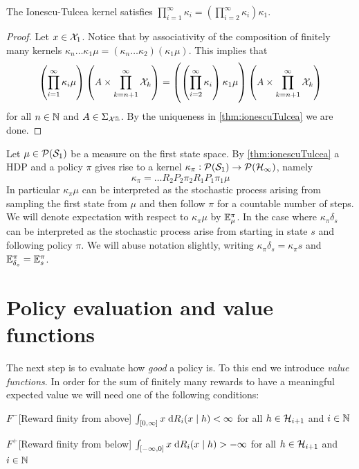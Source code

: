 \begin{lem}
  The Ionescu-Tulcea kernel satisfies
  $\prod_{i=1}^\infty \kappa_i = (\prod_{i=2}^\infty \kappa_i) \kappa_1 $.
  \label{lem:ionescu}
\end{lem}
\begin{proof}
  Let $x \in \mathcal{X}_1$.
  Notice that by associativity of the composition of finitely many
  kernels
  $\kappa_n \dots \kappa_1 \mu
  = (\kappa_n \dots \kappa_2) (\kappa_1 \mu)$.
  This implies that
  \[ \left( \prod_{i=1}^\infty \kappa_i \mu \right)
    \left( A \times \prod_{k=n+1}^\infty \mathcal{X}_k \right)
    = \left( \left( \prod_{i=2}^\infty \kappa_i \right) \kappa_1 \mu \right)
  \left( A \times \prod_{k=n+1}^\infty \mathcal{X}_k \right) \]
  for all $n \in \mathbb{N}$ and $A \in \Sigma_{\mathcal{X}^{\underline{n}}}$.
  By the uniqueness in \cref{thm:ionescuTulcea} we are done.
\end{proof}

Let $\mu \in \mathcal{P}(\mathcal{S}_1)$ be a measure on the first state space.
By \cref{thm:ionescuTulcea} a HDP and a policy $\pi$ gives rise to
a kernel $\kappa_\pi : \mathcal{P}(\mathcal{S}_1) \to \mathcal{P}(\mathcal{H}_\infty)$, namely
\begin{equation}
  \kappa_\pi = \dots R_2 P_2 \pi_2 R_1 P_1 \pi_1 \mu
  \label{eq:kappaPi}
\end{equation}
In particular $\kappa_\pi \mu$ can be interpreted as the stochastic process
arising from sampling the first state from $\mu$ and then follow $\pi$
for a countable number of steps.
We will denote expectation with respect to $\kappa_\pi \mu$ by
$\mathbb{E}_{\mu}^\pi$. 
In the case where 
$\kappa_\pi \delta_{s}$ can be interpreted as the stochastic process
arise from starting in state $s$ and following policy $\pi$.
We will abuse notation slightly, writing
$\kappa_\pi \delta_s = \kappa_\pi s$ and $\mathbb{E}_{\delta_s}^\pi = \mathbb{E}_s^\pi$.

\section{Policy evaluation and value functions}
The next step is to evaluate how \emph{good} a policy is.
To this end we introduce \emph{value functions}.
In order for the sum of finitely many rewards
to have a meaningful expected value
we will need one of
the following conditions:

\begin{cond}{$F^-$}[Reward finity from above]
  $\int_{[0,\infty]} x \; \mathrm{d} R_i(x \mid h) < \infty$ for all
  $h \in \mathcal{H}_{i+1}$ and $i \in \mathbb{N}$
  \label{cond:F-}
\end{cond}
\begin{cond}{$F^+$}[Reward finity from below]
  $\int_{[-\infty,0]} x \; \mathrm{d} R_i(x \mid h) > -\infty$ for all
  $h \in \mathcal{H}_{i+1}$ and $i \in \mathbb{N}$
  \label{cond:F+}
\end{cond}


